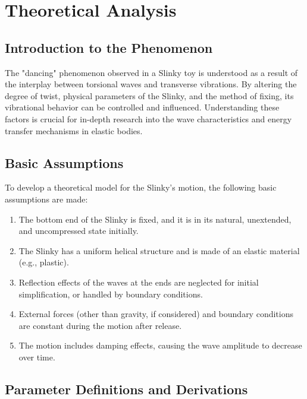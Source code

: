 \documentclass{mcmthesis}  %
\begin{document}
\section{Theoretical Analysis} %

\subsection{Introduction to the Phenomenon}
The "dancing" phenomenon observed in a Slinky toy is understood as a result of the interplay between torsional waves and transverse vibrations. By altering the degree of twist, physical parameters of the Slinky, and the method of fixing, its vibrational behavior can be controlled and influenced. Understanding these factors is crucial for in-depth research into the wave characteristics and energy transfer mechanisms in elastic bodies.

\subsection{Basic Assumptions}
To develop a theoretical model for the Slinky's motion, the following basic assumptions are made:
\begin{enumerate}
    \item The bottom end of the Slinky is fixed, and it is in its natural, unextended, and uncompressed state initially.
    \item The Slinky has a uniform helical structure and is made of an elastic material (e.g., plastic).
    \item Reflection effects of the waves at the ends are neglected for initial simplification, or handled by boundary conditions.
    \item External forces (other than gravity, if considered) and boundary conditions are constant during the motion after release.
    \item The motion includes damping effects, causing the wave amplitude to decrease over time.
\end{enumerate}

\subsection{Parameter Definitions and Derivations}
\end{document}
